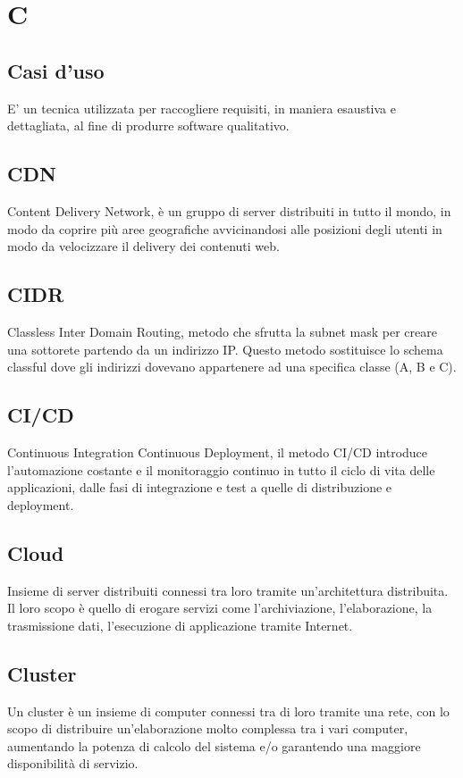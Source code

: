 \documentclass{classes/base}
\begin{document}
        \newpage  
    \section{C}
        \subsection*{Casi d'uso} 
        E' un tecnica utilizzata per raccogliere requisiti, in maniera esaustiva e dettagliata, al fine di produrre software qualitativo.

        \subsection*{CDN}
        Content Delivery Network, è un gruppo di server distribuiti in tutto il mondo, in modo da coprire più aree geografiche avvicinandosi alle posizioni degli utenti in modo da velocizzare il delivery dei contenuti web.
    
        \subsection*{CIDR}
        Classless Inter Domain Routing, metodo che sfrutta la subnet mask per creare una sottorete partendo da un indirizzo IP.  Questo metodo sostituisce lo schema classful dove gli indirizzi dovevano appartenere ad una specifica classe (A, B e C).
    
        \subsection*{CI/CD}
        Continuous Integration Continuous Deployment, il metodo CI/CD introduce l'automazione costante e il monitoraggio continuo in tutto il ciclo di vita delle applicazioni, dalle fasi di integrazione e test a quelle di distribuzione e deployment.
    
        \subsection*{Cloud}
        Insieme di server distribuiti connessi tra loro tramite un'architettura distribuita. Il loro scopo è quello di erogare servizi come l'archiviazione, l'elaborazione, la trasmissione dati, l'esecuzione di applicazione tramite Internet.
        
        \subsection*{Cluster}
        Un cluster è un insieme di computer connessi tra di loro tramite una rete, con lo scopo di distribuire un'elaborazione molto complessa tra i vari computer, aumentando la potenza di calcolo del sistema e/o garantendo una maggiore disponibilità di servizio.
    
\end{document}
